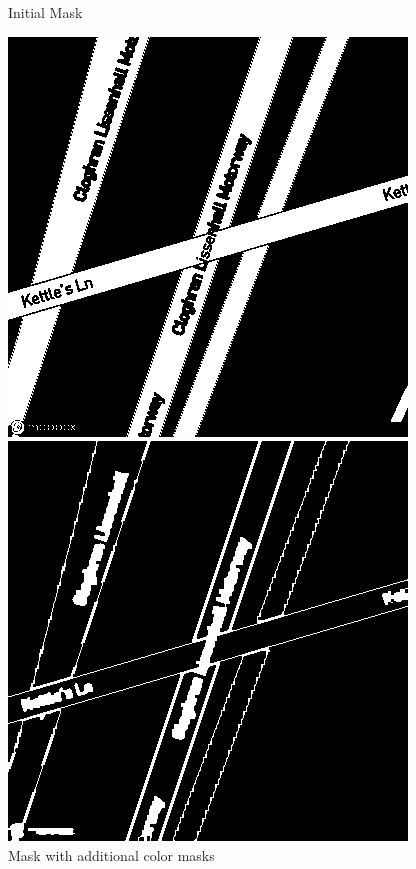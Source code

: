 \begin{figure}[htbp]
\begin{minipage}{0.45\textwidth}
        \caption*{Initial Mask}
    \end{minipage}
    \hfill
    \begin{minipage}{0.45\textwidth}
        \centering
        \includegraphics[width=\textwidth]{images/new_mask.png}
        \caption*{Mask with additional color masks}
    \end{minipage}
    \hfill
    \begin{minipage}{0.45\textwidth}
        \centering
        \includegraphics[width=\textwidth]{images/canny_edge_mask.png}

\end{minipage}
\end{figure}
